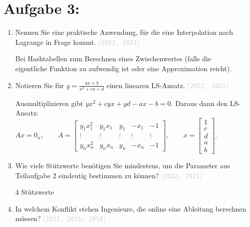 \documentclass[12pt]{article}
\newcommand{\kommentarMacro}[1]{\textcolor{lightgray}{(\texttt{#1})}}
\begin{document}
\section*{Aufgabe 3:}
\begin{enumerate}
    \item Nennen Sie eine praktische Anwendung, für die eine Interpolation nach Lagrange in Frage kommt. \kommentarMacro{2022, 2021}

          \begin{solution}
              Bei Hashtabellen zum Berechnen eines Zwischenwertes (falls die\\ eigentliche Funktion zu aufwendig ist oder eine Approximation reicht).
          \end{solution}

    \item Notieren Sie für $y = \frac{ax + b}{x^2 + cx + d}$ einen linearen LS-Ansatz. \kommentarMacro{2022, 2021}

          \begin{solution}
              Ausmultiplizieren gibt $yx^2 + cyx + yd - ax - b = 0$. Daraus dann den LS-Ansatz:\\

              $Ax = 0_n,\qquad A = \begin{bmatrix}
                      y_1x_1^2 & y_1x_1 & y_1    & -x_1   & -1     \\
                      \vdots   & \vdots & \vdots & \vdots & \vdots \\
                      y_nx_n^2 & y_nx_n & y_n    & -x_n   & -1
                  \end{bmatrix}, \qquad x = \begin{bmatrix}
                      1 \\c\\d\\a\\b
                  \end{bmatrix}$.
          \end{solution}

    \item Wie viele Stützwerte benötigen Sie mindestens, um die Parameter aus Teilaufgabe 2 eindeutig bestimmen zu können? \kommentarMacro{2022, 2021}

          \begin{solution}
              4 Stützwerte
          \end{solution}

    \item In welchem Konflikt stehen Ingenieure, die online eine Ableitung berechnen müssen? \kommentarMacro{2022, 2021, 2018}


\end{enumerate}
\end{document}
